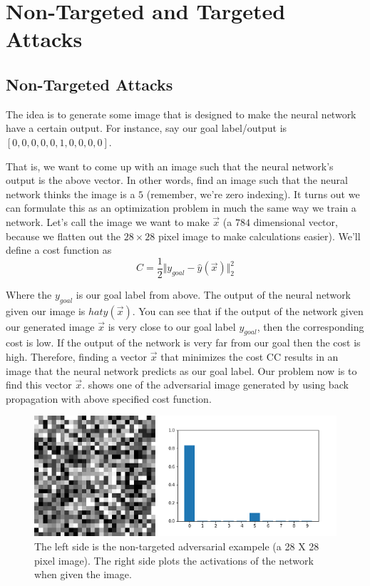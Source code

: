 \section{Non-Targeted and Targeted Attacks}

    \subsection{Non-Targeted Attacks}
        The idea is to generate some image that is designed to make the neural network have a certain output. For instance, say our goal label/output is $[0, 0, 0, 0, 0, 1, 0, 0, 0, 0]$.

        That is, we want to come up with an image such that the neural network’s output is the above vector. In other words, find an image such that the neural network thinks the image is a $5$ (remember, we’re zero indexing). It turns out we can formulate this as an optimization problem in much the same way we train a network. Let’s call the image we want to make $\overrightarrow{x}$ (a $784$ dimensional vector, because we flatten out the $28 \times 28$ pixel image to make calculations easier). We’ll define a cost function as $$ C = \frac{1}{2} \Vert y_{goal} - \hat{y}(\overrightarrow{x}) \Vert_{2}^{2} $$

        Where the $y_{goal}$ is our goal label from above. The output of the neural network given our image is $ hat{y}(\overrightarrow{x})$. You can see that if the output of the network given our generated image $\overrightarrow{x}$ is very close to our goal label $ y_{goal}$, then the corresponding cost is low. If the output of the network is very far from our goal then the cost is high. Therefore, finding a vector $\overrightarrow{x}$ that minimizes the cost CC results in an image that the neural network predicts as our goal label. Our problem now is to find this vector $\overrightarrow{x}$.  shows one of the adversarial image generated by using back propagation with above specified cost function.

        \begin{figure}[htbp]
            \centering
                \includegraphics[width=0.7\linewidth]{images/non_targeted1.png}
            \caption{The left side is the non-targeted adversarial exampele (a 28 X 28 pixel image). The right side plots the activations of the network when given the image.}
            \label{fig:non_targeted}
        \end{figure}

